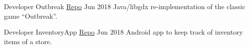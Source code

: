 \begin{cventries}
  \cventry
    {Developer} %
    {Outbreak \tiny{\href{https://github.com/mido3ds/Outbreak}{Repo}}} %
    {} %
    {Jun 2018} %
    {
      {Java​/libgdx re-implementation of the classic ​game​ ``Outbreak”.}
    }

  \cventry
    {Developer} %
    {InventoryApp \tiny{\href{https://github.com/mido3ds/InventoryApp}{Repo}}} %
    {} %
    {Jun 2018} %
    {
      Android​ app to keep track of inventory ​items of a store​.
    }

\end{cventries}
